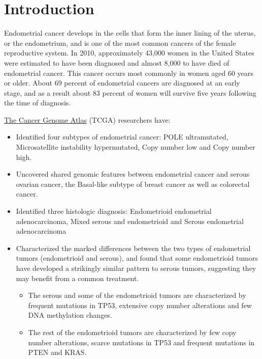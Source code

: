 \documentclass[9pt,twocolumn,twoside]{gsajnl}
\begin{document}
\section*{Introduction}

Endometrial cancer develops in the cells that form the inner lining of the uterus, or the endometrium, and is one of the most common cancers of the female reproductive system. In 2010, approximately 43,000 women in the United States were estimated to have been diagnosed and almost 8,000 to have died of endometrial cancer. This cancer occurs most commonly in women aged 60 years or older. About 69 percent of endometrial cancers are diagnosed at an early stage, and as a result about 83 percent of women will survive five years following the time of diagnosis.

\href{http://cancergenome.nih.gov/cancersselected/endometrial}{The Cancer Genome Atlas} (TCGA) researchers have: 
\begin{itemize}
\item Identified four subtypes of endometrial cancer: POLE ultramutated, Microsatellite instability hypermutated, Copy number low and Copy number high.
\item Uncovered shared genomic features between endometrial cancer and serous ovarian cancer, the Basal-like subtype of breast cancer as well as colorectal cancer.
\item Identified three histologic diagnosis: Endometrioid endometrial adenocarcinoma, Mixed serous and endometrioid and Serous endometrial adenocarcinoma
\item Characterized the marked differences between the two types of endometrial tumors (endometrioid and serous), and found that some endometrioid tumors have developed a strikingly similar pattern to serous tumors, suggesting they may benefit from a common treatment.
\begin{itemize}
\item The serous and some of the endometrioid tumors are characterized by frequent mutations in TP53, extensive copy number alterations and few DNA methylation changes.
\item The rest of the endometrioid tumors are characterized by few copy number alterations, scarce mutations in TP53 and frequent mutations in PTEN and KRAS.
\end{itemize}
\end{itemize}

\end{document}

